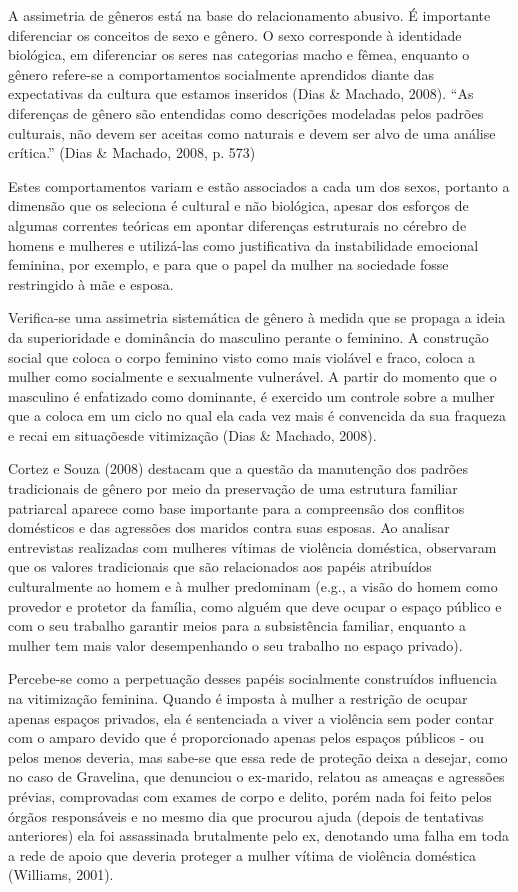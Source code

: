 A assimetria de gêneros está na base do relacionamento abusivo. É importante diferenciar os conceitos de sexo e gênero. O sexo corresponde à identidade biológica, em diferenciar os seres nas categorias macho e fêmea, enquanto o gênero refere-se a comportamentos socialmente aprendidos diante das expectativas da cultura que estamos inseridos (Dias \& Machado, 2008). ``As diferenças de gênero são entendidas como descrições modeladas pelos padrões culturais, não devem ser aceitas como naturais e devem ser alvo de uma análise crítica.'' (Dias \& Machado, 2008, p. 573) 

Estes comportamentos variam e estão associados a cada um dos sexos, portanto a dimensão que os seleciona é cultural e não biológica, apesar dos esforços de algumas correntes teóricas em apontar diferenças estruturais no cérebro de homens e mulheres e utilizá-las como justificativa da instabilidade emocional feminina, por exemplo, e para que o papel da mulher na sociedade fosse restringido à mãe e esposa.

Verifica-se uma assimetria sistemática de gênero à medida que se propaga a ideia da superioridade e dominância do masculino perante o feminino. A construção social que coloca o corpo feminino visto como mais violável e fraco, coloca a mulher como socialmente e sexualmente vulnerável. A partir do momento que o masculino é enfatizado como dominante, é exercido um controle sobre a mulher que a coloca em um ciclo no qual ela cada vez mais é convencida da sua fraqueza e recai em situaçõesde vitimização (Dias \& Machado, 2008).

Cortez e Souza (2008) destacam que a questão da manutenção dos padrões tradicionais de gênero por meio da preservação de uma estrutura familiar patriarcal aparece como base importante para a compreensão dos conflitos domésticos e das agressões dos maridos contra suas esposas. Ao analisar entrevistas realizadas com mulheres vítimas de violência doméstica, observaram que os valores tradicionais que são relacionados aos papéis atribuídos culturalmente ao homem e à mulher predominam (e.g., a visão do homem como provedor e protetor da família, como alguém que deve ocupar o espaço público e com o seu trabalho garantir meios para a subsistência familiar, enquanto a mulher tem mais valor desempenhando o seu trabalho no espaço privado).

Percebe-se como a perpetuação desses papéis socialmente construídos influencia na vitimização feminina. Quando é imposta à mulher a restrição de ocupar apenas espaços privados, ela é sentenciada a viver a violência sem poder contar com o amparo devido que é proporcionado apenas pelos espaços públicos - ou pelos menos deveria, mas sabe-se que essa rede de proteção deixa a desejar, como no caso de Gravelina, que denunciou o ex-marido, relatou as ameaças e agressões prévias, comprovadas com exames de corpo e delito, porém nada foi feito pelos órgãos responsáveis e no mesmo dia que procurou ajuda (depois de tentativas anteriores) ela foi assassinada brutalmente pelo ex, denotando uma falha em toda a rede de apoio que deveria proteger a mulher vítima de violência doméstica (Williams, 2001).

